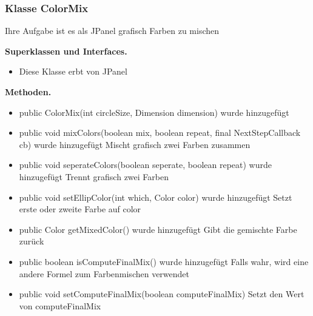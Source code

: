 \documentclass{article}
\begin{document}
	\subsubsection{Klasse ColorMix}
    Ihre Aufgabe ist es als JPanel grafisch Farben zu mischen\newline

	    \textbf{Superklassen und Interfaces.}\newline
	   \begin{itemize}
            \item Diese Klasse erbt von JPanel\newline
           \end{itemize}

    \textbf{Methoden.}\newline
	   \begin{itemize}
           \item public ColorMix(int circleSize, Dimension dimension) wurde hinzugefügt\newline
           \item public void mixColors(boolean mix, boolean repeat, final NextStepCallback cb) wurde hinzugefügt\newline
               Mischt grafisch zwei Farben zusammen\newline
           \item public void seperateColors(boolean seperate, boolean repeat) wurde hinzugefügt\newline
               Trennt grafisch zwei Farben\newline
           \item public void setEllipColor(int which, Color color) wurde hinzugefügt\newline
               Setzt erste oder zweite Farbe auf color\newline
           \item public Color getMixedColor() wurde hinzugefügt\newline
               Gibt die gemischte Farbe zurück\newline
           \item public boolean isComputeFinalMix() wurde hinzugefügt\newline
               Falls wahr, wird eine andere Formel zum Farbenmischen verwendet\newline
           \item public void setComputeFinalMix(boolean computeFinalMix)\newline
               Setzt den Wert von computeFinalMix\newline
           \end{itemize}
\end{document}
